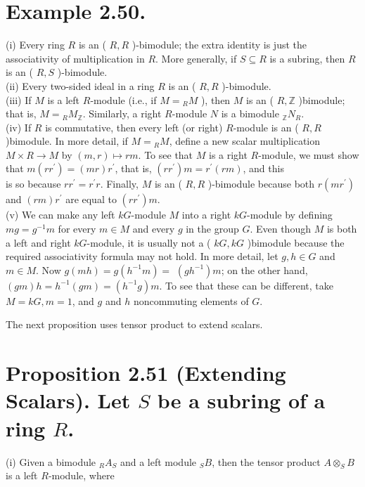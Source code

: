 \documentclass[10pt, letterpaper]{article}
\begin{document}
\section*{Example 2.50.}
(i) Every ring $R$ is an ( $R, R$ )-bimodule; the extra identity is just the associativity of multiplication in $R$. More generally, if $S \subseteq R$ is a subring, then $R$ is an ( $R, S$ )-bimodule.\\
(ii) Every two-sided ideal in a ring $R$ is an ( $R, R$ )-bimodule.\\
(iii) If $M$ is a left $R$-module (i.e., if $M={ }_{R} M$ ), then $M$ is an ( $R, \mathbb{Z}$ )bimodule; that is, $M={ }_{R} M_{\mathbb{Z}}$. Similarly, a right $R$-module $N$ is a bimodule ${ }_{\mathbb{Z}} N_{R}$.\\
(iv) If $R$ is commutative, then every left (or right) $R$-module is an ( $R, R$ )bimodule. In more detail, if $M={ }_{R} M$, define a new scalar multiplication $M \times R \rightarrow M$ by $(m, r) \mapsto r m$. To see that $M$ is a right $R$-module, we must show that $m\left(r r^{\prime}\right)=(m r) r^{\prime}$, that is, $\left(r r^{\prime}\right) m=r^{\prime}(r m)$, and this\\
is so because $r r^{\prime}=r^{\prime} r$. Finally, $M$ is an ( $R, R$ )-bimodule because both $r\left(m r^{\prime}\right)$ and $(r m) r^{\prime}$ are equal to $\left(r r^{\prime}\right) m$.\\
(v) We can make any left $k G$-module $M$ into a right $k G$-module by defining $m g=g^{-1} m$ for every $m \in M$ and every $g$ in the group $G$. Even though $M$ is both a left and right $k G$-module, it is usually not a ( $k G, k G$ )bimodule because the required associativity formula may not hold. In more detail, let $g, h \in G$ and $m \in M$. Now $g(m h)=g\left(h^{-1} m\right)=$ $\left(g h^{-1}\right) m$; on the other hand, $(g m) h=h^{-1}(g m)=\left(h^{-1} g\right) m$. To see that these can be different, take $M=k G, m=1$, and $g$ and $h$ noncommuting elements of $G$.

The next proposition uses tensor product to extend scalars.

\section*{Proposition 2.51 (Extending Scalars). Let $S$ be a subring of a ring $R$.}
(i) Given a bimodule ${ }_{R} A_{S}$ and a left module ${ }_{S} B$, then the tensor product $A \otimes_{S} B$ is a left $R$-module, where
\end{document}
